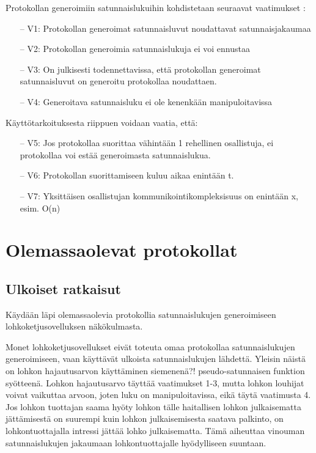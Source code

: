 \documentclass{article}
\begin{document}
Protokollan generoimiin satunnaislukuihin kohdistetaan seuraavat vaatimukset \cite{simic_review_2020}:
\begin{itemize}
    \item[--] V1: Protokollan generoimat satunnaisluvut noudattavat satunnaisjakaumaa
    \item[--] V2: Protokollan generoimia satunnaislukuja ei voi ennustaa
    \item[--] V3: On julkisesti todennettavissa, että protokollan generoimat satunnaisluvut on generoitu protokollaa noudattaen.
    \item[--] V4: Generoitava satunnaisluku ei ole kenenkään manipuloitavissa
\end{itemize}\textbf{}
Käyttötarkoituksesta riippuen voidaan vaatia, että:

\begin{itemize}
    \item[--] V5: Jos protokollaa suorittaa vähintään 1 rehellinen osallistuja, ei protokollaa voi estää generoimasta satunnaislukua.
    \item[--] V6: Protokollan suorittamiseen kuluu aikaa enintään t.
    \item[--] V7: Yksittäisen osallistujan kommunikointikompleksisuus on enintään x, esim. O(n)
\end{itemize}

\section{Olemassaolevat protokollat}

\subsection{Ulkoiset ratkaisut}
Käydään läpi olemassaolevia protokollia satunnaislukujen generoimiseen lohkoketjusovelluksen näkökulmasta. 

Monet lohkoketjusovellukset eivät toteuta omaa protokollaa satunnaislukujen generoimiseen, vaan käyttävät ulkoista satunnaislukujen lähdettä. Yleisin näistä on lohkon hajautusarvon käyttäminen siemenenä?! pseudo-satunnaisen funktion syötteenä. Lohkon hajautusarvo täyttää vaatimukset 1-3, mutta lohkon louhijat voivat vaikuttaa arvoon, joten luku on manipuloitavissa, eikä täytä vaatimusta 4. Jos lohkon tuottajan saama hyöty lohkon tälle haitallisen lohkon julkaisematta jättämisestä on suurempi kuin lohkon julkaisemisesta saatava palkinto, on lohkontuottajalla intressi jättää lohko julkaisematta. Tämä aiheuttaa vinouman satunnaislukujen jakaumaan lohkontuottajalle hyödylliseen suuntaan.
\end{document}
